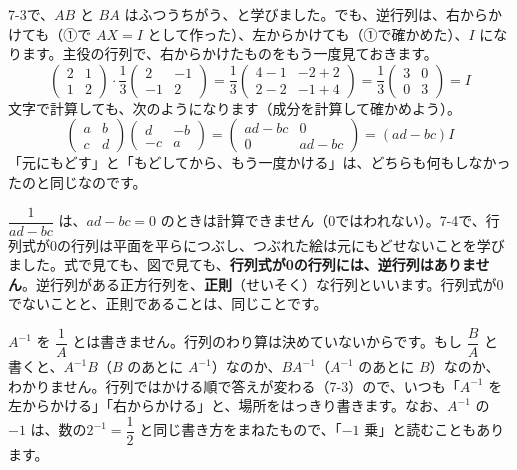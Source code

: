 7-3で、$AB$ と $BA$ はふつうちがう、と学びました。でも、逆行列は、右からかけても（①で $AX=I$ として作った）、左からかけても（①で確かめた）、$I$ になります。主役の行列で、右からかけたものをもう一度見ておきます。
\[ \begin{pmatrix}2&1\\1&2\end{pmatrix}\cdot\frac{1}{3}\begin{pmatrix}2&-1\\-1&2\end{pmatrix}=\frac{1}{3}\begin{pmatrix}4-1&-2+2\\2-2&-1+4\end{pmatrix}=\frac{1}{3}\begin{pmatrix}3&0\\0&3\end{pmatrix}=I \]
文字で計算しても、次のようになります（成分を計算して確かめよう）。
\[ \begin{pmatrix}a&b\\c&d\end{pmatrix}\begin{pmatrix}d&-b\\-c&a\end{pmatrix}=\begin{pmatrix}ad-bc&0\\0&ad-bc\end{pmatrix}=(ad-bc)I \]
「元にもどす」と「もどしてから、もう一度かける」は、どちらも何もしなかったのと同じなのです。

$\dfrac{1}{ad-bc}$ は、$ad-bc=0$ のときは計算できません（0ではわれない）。7-4で、行列式が0の行列は平面を平らにつぶし、つぶれた絵は元にもどせないことを学びました。式で見ても、図で見ても、\textbf{行列式が0の行列には、逆行列はありません}。逆行列がある正方行列を、\textbf{正則}（せいそく）な行列といいます。行列式が0でないことと、正則であることは、同じことです。

\begin{seikaku}
$A^{-1}$ を $\dfrac{1}{A}$ とは書きません。行列のわり算は決めていないからです。もし $\dfrac{B}{A}$ と書くと、$A^{-1}B$（$B$ のあとに $A^{-1}$）なのか、$BA^{-1}$（$A^{-1}$ のあとに $B$）なのか、わかりません。行列ではかける順で答えが変わる（7-3）ので、いつも「$A^{-1}$ を左からかける」「右からかける」と、場所をはっきり書きます。なお、$A^{-1}$ の $-1$ は、数の\mbox{$2^{-1}=\dfrac{1}{2}$} と同じ書き方をまねたもので、「$-1$ 乗」と読むこともあります。
\end{seikaku}

